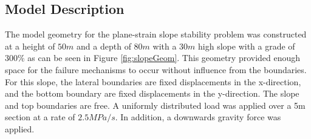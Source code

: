 \subsection{Model Description}

The model geometry for the plane-strain slope stability problem was constructed at a height of $50m$ and a depth of $80m$ with a $30m$ high slope with a grade of $300\%$ as can be seen in Figure \ref{fig:slopeGeom}. This geometry provided enough space for the failure mechanisms to occur without influence from the boundaries. For this slope, the lateral boundaries are fixed displacements in the x-direction, and the bottom boundary are fixed displacements in the y-direction. The slope and top boundaries are free. A uniformly distributed load was applied over a 5m section at a rate of $2.5 MPa/s$. In addition, a downwards gravity force was applied.
